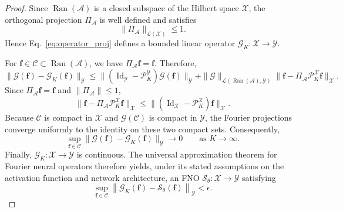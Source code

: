 \documentclass[preprint,numbers,sort&compress]{elsarticle}
\begin{document}
			\begin{proof}
				Since $\operatorname{Ran}(\mathcal A)$ is a closed subspace of the
				Hilbert space $\mathcal X$, the orthogonal projection
				$\Pi_{\mathcal A}$ is well defined and satisfies
				\[
				\|\Pi_{\mathcal A}\|_{\mathcal L(\mathcal X)}\leq 1.
				\]
				Hence Eq.~\eqref{eq:operator_proj} defines a bounded linear operator
				$\mathcal G_K:\mathcal X\to\mathcal Y$.
				
				For $\boldsymbol f\in\mathcal C\subset\operatorname{Ran}(\mathcal A)$,
				we have
				$\Pi_{\mathcal A}\boldsymbol f=\boldsymbol f$. Therefore,
				\[
				\|
				\mathcal G(\boldsymbol f)
				-
				\mathcal G_K(\boldsymbol f)
				\|_{\mathcal Y}
				\leq
				\|
				(\operatorname{Id}_{\mathcal Y}
				-
				\mathcal P_K^{\mathcal Y})
				\mathcal G(\boldsymbol f)
				\|_{\mathcal Y}
				+
				\|\mathcal G\|_{\mathcal L(\operatorname{Ran}(\mathcal A),\mathcal Y)}
				\|
				\boldsymbol f
				-
				\Pi_{\mathcal A}
				\mathcal P_K^{\mathcal X}
				\boldsymbol f
				\|_{\mathcal X}.
				\]
				Since $\Pi_{\mathcal A}\boldsymbol f=\boldsymbol f$ and
				$\|\Pi_{\mathcal A}\|\leq1$,
				\[
				\|
				\boldsymbol f
				-
				\Pi_{\mathcal A}
				\mathcal P_K^{\mathcal X}\boldsymbol f
				\|_{\mathcal X}
				\leq
				\|
				(\operatorname{Id}_{\mathcal X}
				-
				\mathcal P_K^{\mathcal X})
				\boldsymbol f
				\|_{\mathcal X}.
				\]
				Because $\mathcal C$ is compact in $\mathcal X$ and
				$\mathcal G(\mathcal C)$ is compact in $\mathcal Y$, the Fourier
				projections converge uniformly to the identity on these two compact
				sets. Consequently,
				\[
				\sup_{\boldsymbol f\in\mathcal C}
				\|
				\mathcal G(\boldsymbol f)
				-
				\mathcal G_K(\boldsymbol f)
				\|_{\mathcal Y}
				\longrightarrow0
				\qquad
				\text{as }K\to\infty.
				\]
				Finally, $\mathcal G_K:\mathcal X\to\mathcal Y$ is continuous.
				The universal approximation theorem for Fourier neural operators
				\cite[Theorem~5]{kovachki2021universal}
				therefore yields, under its stated assumptions on the activation
				function and network architecture, an FNO
				$\mathcal S_\theta:\mathcal X\to\mathcal Y$ satisfying
				\[
				\sup_{\boldsymbol f\in\mathcal C}
				\left\|
				\mathcal G_K(\boldsymbol f)
				-
				\mathcal S_\theta(\boldsymbol f)
				\right\|_{\mathcal Y}
				<\epsilon.
				\]
			\end{proof}
			
\end{document}
